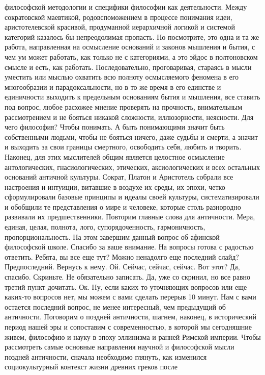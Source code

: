 философской методологии и специфики философии как деятельности. Между
сократовской маевтикой, родовспоможением в процессе понимания идеи,
аристотелевской красивой, продуманной иерархичной логикой и системой категорий
казалось бы непреодолимая пропасть. Но посмотрите, это одна и та же работа,
направленная на осмысление оснований и законов мышления и бытия, с чем ум может
работать, как только не с категориями, а это эйдос в полтоновском смысле и есть,
как работать. Последовательно, проговаривая, стараясь в мысли уместить или
мыслью охватить всю полноту осмысляемого феномена в его многообразии и
парадоксальности, но в то же время в его единстве и единичности выходить к
предельным основаниям бытия и мышления, все ставить под вопрос, любое расхожее
мнение проверять на прочность, внимательным рассмотрением и не бояться никакой
сложности, иллюзорности, неясности. Для чего философия? Чтобы понимать. А быть
понимающими значит быть собственными людьми, чтобы не бояться ничего, даже
судьбы и смерти, а значит и выходить за свои границы смертного, освободить себя,
любить и творить. Наконец, для этих мыслителей общим является целостное
осмысление антологических, гнасиологических, этических, аксиологических и всех
остальных оснований античной культуры. Сократ, Платон и Аристотель собрали все
настроения и интуиции, витавшие в воздухе их среды, их эпохи, четко
сформулировали базовые принципы и идеалы своей культуры, систематизировали и
обобщили те представления о мире и человеке, которые столь разнородно развивали
их предшественники. Повторим главные слова для античности. Мера, единая, целая,
полнота, лого, супорядоченность, гармоничность, пропорциональность. На этом
завершим данный вопрос об афинской философской школе. Спасибо за ваше внимание.
На вопросы готова с радостью ответить. Ребята, вы все еще тут? Можно ненадолго
еще последний слайд? Предпоследний. Вернусь к нему. Ой. Сейчас, сейчас, сейчас.
Вот этот? Да, спасибо. Скриньте. Не обязательно записать. Да, уже со скринил, но
все равно третий пункт дочитать. Ок. Ну, если каких-то уточняющих вопросов или
еще каких-то вопросов нет, мы можем с вами сделать перерыв 10 минут. Нам с вами
остается последний вопрос, не менее интересный, чем предыдущий об античности.
Поговорим о поздней античности, шагнем, наконец, в исторический период нашей эры
и сопоставим с современностью, в которой мы сегодняшние живем, философию и науку
в эпоху эллинизма и ранней Римской империи. Чтобы рассмотреть самые основные
направления научной и философской мысли поздней античности, сначала необходимо
глянуть, как изменился социокультурный контекст жизни древних греков после

